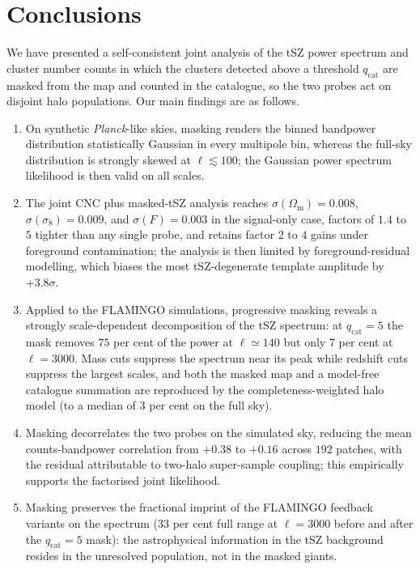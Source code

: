 \documentclass[aps,prd,twocolumn,superscriptaddress,nofootinbib,floatfix]{revtex4-2}
\begin{document}
\section{Conclusions}
\label{sec:conclusions}

We have presented a self-consistent joint analysis of the tSZ power spectrum and cluster number counts in which the clusters detected above a threshold $q_{\mathrm{cat}}$ are masked from the map and counted in the catalogue, so the two probes act on disjoint halo populations.
Our main findings are as follows.
\begin{enumerate}
    \item On synthetic \textit{Planck}-like skies, masking renders the binned bandpower distribution statistically Gaussian in every multipole bin, whereas the full-sky distribution is strongly skewed at $\ell \lesssim 100$; the Gaussian power spectrum likelihood is then valid on all scales.
    \item The joint CNC plus masked-tSZ analysis reaches $\sigma(\Omega_{\mathrm{m}}) = 0.008$, $\sigma(\sigma_8) = 0.009$, and $\sigma(F) = 0.003$ in the signal-only case, factors of $1.4$ to $5$ tighter than any single probe, and retains factor $2$ to $4$ gains under foreground contamination; the analysis is then limited by foreground-residual modelling, which biases the most tSZ-degenerate template amplitude by $+3.8\sigma$.
    \item Applied to the FLAMINGO simulations, progressive masking reveals a strongly scale-dependent decomposition of the tSZ spectrum: at $q_{\mathrm{cat}} = 5$ the mask removes $75$ per cent of the power at $\ell \simeq 140$ but only $7$ per cent at $\ell = 3000$.
    Mass cuts suppress the spectrum near its peak while redshift cuts suppress the largest scales, and both the masked map and a model-free catalogue summation are reproduced by the completeness-weighted halo model (to a median of $3$ per cent on the full sky).
    \item Masking decorrelates the two probes on the simulated sky, reducing the mean counts-bandpower correlation from $+0.38$ to $+0.16$ across $192$ patches, with the residual attributable to two-halo super-sample coupling; this empirically supports the factorised joint likelihood.
    \item Masking preserves the fractional imprint of the FLAMINGO feedback variants on the spectrum ($33$ per cent full range at $\ell = 3000$ before and after the $q_{\mathrm{cat}} = 5$ mask): the astrophysical information in the tSZ background resides in the unresolved population, not in the masked giants.
\end{enumerate}
\end{document}
